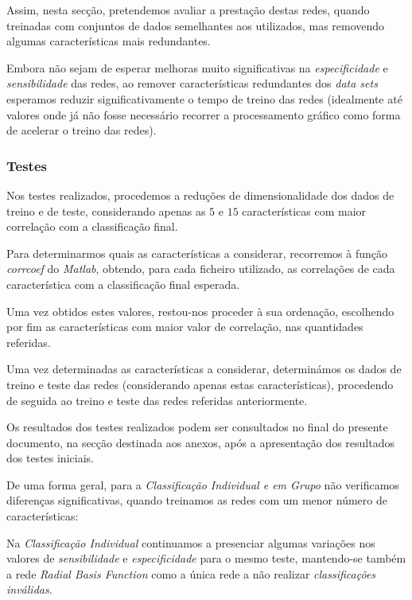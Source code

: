 \documentclass{article}
\begin{document}
Assim, nesta secção, pretendemos avaliar a prestação destas redes, quando treinadas com conjuntos de dados semelhantes aos utilizados, mas removendo algumas características mais redundantes.

Embora não sejam de esperar melhoras muito significativas na \emph{especificidade} e \emph{sensibilidade} das redes, ao remover características redundantes dos \emph{data sets} esperamos reduzir significativamente o tempo de treino das redes (idealmente até valores onde já não fosse necessário recorrer a processamento gráfico como forma de acelerar o treino das redes).

\subsubsection{Testes}

Nos testes realizados, procedemos a reduções de dimensionalidade dos dados de treino e de teste, considerando apenas as $5$ e $15$ características com maior correlação com a classificação final.

Para determinarmos quais as características a considerar, recorremos à função \emph{corrcoef} do \emph{Matlab}, obtendo, para cada ficheiro utilizado, as correlações de cada característica com a classificação final esperada.

Uma vez obtidos estes valores, restou-nos proceder à sua ordenação, escolhendo por fim as características com maior valor de correlação, nas quantidades referidas.

Uma vez determinadas as características a considerar, determinámos os dados de treino e teste das redes (considerando apenas estas características), procedendo de seguida ao treino e teste das redes referidas anteriormente.

Os resultados dos testes realizados podem ser consultados no final do presente documento, na secção destinada aos anexos, após a apresentação dos resultados dos testes iniciais.

De uma forma geral, para a \emph{Classificação Individual e em Grupo} não verificamos diferenças significativas, quando treinamos as redes com um menor número de características:

Na \emph{Classificação Individual} continuamos a presenciar algumas variações nos valores de \emph{sensibilidade} e \emph{especificidade} para o mesmo teste, mantendo-se também a rede \emph{Radial Basis Function} como a única rede a não realizar \emph{classificações inválidas}.
\end{document}
